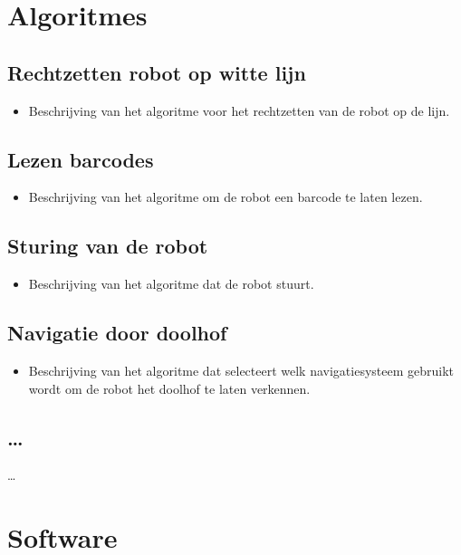 \documentclass[tt2]{penoverslag}
\begin{document}
\section{Algoritmes}
\lipsum[4]

\subsection{Rechtzetten robot op witte lijn}
\begin{itemize}
\item Beschrijving van het algoritme voor het rechtzetten van de robot op de lijn.
\end{itemize}

\subsection{Lezen barcodes}
\begin{itemize}
\item Beschrijving van het algoritme om de robot een barcode te laten lezen.
\end{itemize}

\subsection{Sturing van de robot}
\begin{itemize}
\item Beschrijving van het algoritme dat de robot stuurt.
\end{itemize}

\subsection{Navigatie door doolhof}
\begin{itemize}
\item Beschrijving van het algoritme dat selecteert welk navigatiesysteem gebruikt wordt om de robot het doolhof te laten verkennen.
\end{itemize}

\subsection{\ldots}
\ldots


\section{Software}
\lipsum[5]
\end{document}

